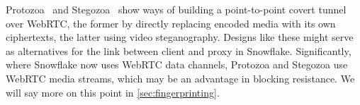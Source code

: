 \documentclass[letterpaper,twocolumn]{article}
\begin{document}
Protozoa~\cite{Barradas2020a}
and Stegozoa~\cite{Figueira2022a}
show ways of building a point-to-point covert tunnel over WebRTC,
the former by directly replacing encoded media
with its own ciphertexts,
the latter using video steganography.
Designs like these might serve as alternatives
for the link between client and proxy in Snowflake.
Significantly, where Snowflake now uses WebRTC data channels,
Protozoa and Stegozoa use WebRTC media streams,
which may be an advantage in blocking resistance.
We will say more on this point in \autoref{sec:fingerprinting}.

\end{document}
